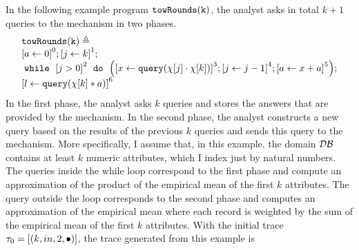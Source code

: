 \begin{example}
    In the following example program $\mathtt{towRounds(k)}$,    the analyst asks in total $k+1$ queries to the mechanism in two phases.
    \[         \begin{array}{l}
      \kw{towRounds(k)} \triangleq \\
             \clabel{ \assign{a}{0}}^{0} ;
              \clabel{\assign{j}{k} }^{1} ;\\
              \ewhile ~ \clabel{j > 0}^{2} ~ \edo ~
              \Big(
               \clabel{\assign{x}{\query(\chi[j] \cdot \chi[k])} }^{3}  ;
               \clabel{\assign{j}{j-1}}^{4} ;
              \clabel{\assign{a}{x + a}}^{5}       \Big);\\
              \clabel{\assign{l}{\query(\chi[k]*a)} }^{6}
          \end{array}
          \]
    In the first phase, the analyst asks $k$ queries and stores the answers that are provided by the mechanism. 
    In the second phase, the analyst constructs a new query based on the results of the previous $k$ queries and sends this query to the mechanism. More specifically, I assume that, in this example, the domain $\mathcal{DB}$ 
    contains at least $k$ numeric attributes, which I index just by natural numbers. 
    The queries inside the while loop correspond to the first phase and compute an approximation of 
    the product of the empirical mean of the first $k$ attributes. 
    The query outside the loop corresponds to the second phase and computes an approximation of the empirical mean where each record is weighted by the sum of the empirical mean of the first $k$ attributes.
    With the initial trace
    $\mathtt{\tau}_0 = [(k, in, 2, \bullet)]$,
    the trace generated from this example is 

\end{example}
